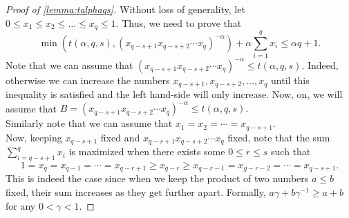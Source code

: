 \documentclass[11pt]{article}%
\numberwithin{theorem}{subsection}
\begin{document}
\noindent
\begin{proof}[Proof of \cref{lemma:talphaqs}]
Without loss of generality, let $0\le x_1 \le x_2\le \ldots\le x_q \le 1.$ Thus, we need to prove that 
$$
\min
\left(
t(\alpha, q, s),
(x_{q-s+1}x_{q-s+2}\cdots x_q)^{-\alpha}
\right) + 
\alpha \sum_{i = 1}^q x_i \le \alpha q + 1.
$$
Note that we can assume that $(x_{q-s+1}x_{q-s+2}\cdots x_q)^{-\alpha} \le t(\alpha,q,s).$ Indeed, otherwise we can increase the numbers $x_{q-s+1},x_{q-s+2},\ldots ,x_q$ until this inequality is satisfied and the left hand-side will only increase. Now, on, we will assume that $B = (x_{q-s+1}x_{q-s+2}\cdots x_q)^{-\alpha} \le t(\alpha,q,s).$\\

\noindent
Similarly note that we can assume that $x_1 = x_2 = \cdots = x_{q-s+1}.$\\

\noindent
Now, keeping $x_{q-s+1}$ fixed and $x_{q-s+1}x_{q-s+2}\cdots x_q$ fixed, note that the sum $\sum_{i = q-s+1}^qx_i$ is maximized when there exists some $0\le r\le s$ such that 
$$
1 = x_q = x_{q-1} = \cdots = x_{q-r+1}\ge 
x_{q-r}\ge x_{q-r-1} = x_{g-r-2} = \cdots = x_{q-s+1}.
$$
This is indeed the case since when we keep the product of two numbers $a\le b$ fixed, their sum increases as they get further apart. Formally, $a\gamma + b\gamma^{-1}\ge a + b$ for any $0<\gamma<1.$


\end{proof}
\end{document}
